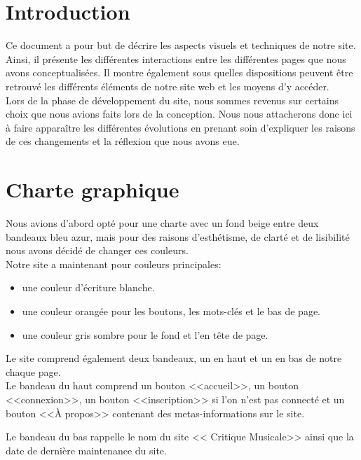 
\section{Introduction}

	\begin{paragraphe}
		Ce document a pour but de décrire les aspects visuels et techniques de notre site.\\
		Ainsi, il présente les différentes interactions entre les différentes pages que nous avons conceptualisées.
		Il montre également sous quelles dispositions peuvent être retrouvé les différents éléments de notre site web et les moyens d'y accéder.\\
		Lors de la phase de développement du site, nous sommes revenus sur certains choix que nous avions faits lors de la conception.
		Nous nous attacherons donc ici à faire apparaître les différentes évolutions en prenant soin d'expliquer les raisons de
		ces changements et la réflexion que nous avons eue.
	\end{paragraphe}

\section{Charte graphique}

	\begin{paragraphe}
	    Nous avions d'abord opté pour une charte avec un fond beige entre deux bandeaux bleu azur, mais pour des raisons
	    d'esthétisme, de clarté et de lisibilité nous avons décidé de changer ces couleurs.\\

		Notre site a maintenant pour couleurs principales:
            \begin{itemize}
            \item une couleur d'écriture blanche.
            \item une couleur orangée pour les boutons, les mots-clés et le bas de page.
            \item une couleur gris sombre pour le fond et l'en tête de page.
            \end{itemize}
    \end{paragraphe}

    \begin{paragraphe}
		Le site comprend également deux bandeaux, un en haut et un en bas de notre chaque page.\\
		Le bandeau du haut comprend un bouton <<accueil>>,
		un bouton <<connexion>>, un bouton <<inscription>> si l'on n'est pas connecté et un bouton <<À propos>> contenant des metas-informations sur le site.

        Le bandeau du bas rappelle le nom du site << Critique Musicale>> ainsi que la date de dernière maintenance du site.
    \end{paragraphe}

